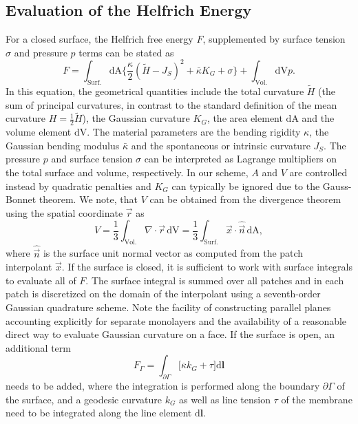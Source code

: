 \documentclass[twocolumn]{biophys-new}
\newcommand{\D}[1]{\mathrm{d#1}}
\begin{document}
\subsection*{Evaluation of the Helfrich Energy}
 For a closed surface, the Helfrich free energy $F$, supplemented by surface tension $\sigma$ and pressure $p$ terms can be stated as 
 \begin{equation}
  F = \int_\mathrm{Surf.} \D{A}  \bigg\{ \frac{{\kappa}}{2} (\tilde{H}-J_S)^2 + \bar{\kappa} K_G  + \sigma \bigg\} +\int_\mathrm{Vol.} \D{V} p.
  \label{eq:helf}
 \end{equation}
In this equation, the geometrical quantities include the total curvature $\tilde{H}$ (the sum of principal curvatures, in contrast to the standard definition of the mean curvature $H=\frac{1}{2}\tilde{H}$), the Gaussian curvature $K_G$, the area element $\D{A}$ and the volume element $\D{V}$. The material parameters are the bending rigidity $\kappa$, the Gaussian bending modulus $\bar{\kappa}$ and the spontaneous or intrinsic curvature $J_S$. The pressure $p$ and surface tension $\sigma$ can be interpreted as Lagrange multipliers on the total surface and volume, respectively. In our scheme, $A$ and $V$ are controlled instead by quadratic penalties and $K_G$ can typically be ignored due to the Gauss-Bonnet theorem. We note, that $V$ can be obtained from the divergence theorem using the spatial coordinate $\vec{r}$ as
\begin{equation}
 V = \frac{1}{3} \int_\mathrm{Vol.} \nabla \cdot {\vec{r}} \,\D{V} =  \frac{1}{3} \int_\mathrm{Surf.}   \vec{x} \cdot \hat{\vec{n}} \,\D{A},
\end{equation}
where $\hat{\vec{n}}$ is the surface unit normal vector as computed from the patch interpolant $\vec{x}$. If the surface is closed, it is sufficient to work with surface integrals to evaluate all of $F$. The surface integral is summed over all patches and in each patch is discretized on the domain of the interpolant using a seventh-order Gaussian quadrature scheme\cite{https://doi.org/10.1002/nme.1620120107}. Note the facility of constructing parallel planes accounting explicitly for separate monolayers and the availability of a reasonable direct way to evaluate Gaussian curvature on a face. 
If the surface is open, an additional term
\begin{equation}
    F_{\Gamma} = \int_{\partial \Gamma} \big[ \overline{\kappa}k_G + \tau \big] \mathrm{d} \mathbf{l}
\end{equation}
needs to be added, where the integration is performed along the boundary $\partial\Gamma$ of the surface, and a geodesic curvature $k_G$ as well as line tension $\tau$ of the membrane need to be integrated along the line element $\mathrm{d}\mathbf{l}$.
\end{document}
